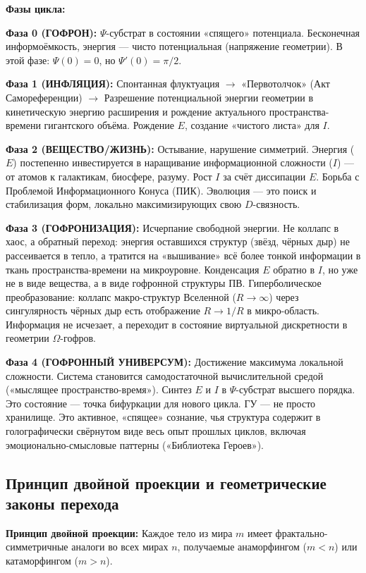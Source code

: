 \documentclass[a4paper,12pt]{article}
\begin{document}
\textbf{Фазы цикла:}

\textbf{Фаза 0 (ГОФРОН):} $\Psi$-субстрат в состоянии «спящего» потенциала. Бесконечная информоёмкость, энергия — чисто потенциальная (напряжение геометрии). В этой фазе: $\Psi(0) = 0$, но $\Psi'(0) = \pi/2$.

\textbf{Фаза 1 (ИНФЛЯЦИЯ):} Спонтанная флуктуация $\to$ «Первотолчок» (Акт Самореференции) $\to$ Разрешение потенциальной энергии геометрии в кинетическую энергию расширения и рождение актуального пространства-времени гигантского объёма. Рождение $E$, создание «чистого листа» для $I$.

\textbf{Фаза 2 (ВЕЩЕСТВО/ЖИЗНЬ):} Остывание, нарушение симметрий. Энергия ($E$) постепенно инвестируется в наращивание информационной сложности ($I$) — от атомов к галактикам, биосфере, разуму. Рост $I$ за счёт диссипации $E$. Борьба с Проблемой Информационного Конуса (ПИК). Эволюция — это поиск и стабилизация форм, локально максимизирующих свою $D$-связность.

\textbf{Фаза 3 (ГОФРОНИЗАЦИЯ):} Исчерпание свободной энергии. Не коллапс в хаос, а обратный переход: энергия оставшихся структур (звёзд, чёрных дыр) не рассеивается в тепло, а тратится на «вышивание» всё более тонкой информации в ткань пространства-времени на микроуровне. Конденсация $E$ обратно в $I$, но уже не в виде вещества, а в виде гофронной структуры ПВ. Гиперболическое преобразование: коллапс макро-структур Вселенной ($R \to \infty$) через сингулярность чёрных дыр есть отображение $R \to 1/R$ в микро-область. Информация не исчезает, а переходит в состояние виртуальной дискретности в геометрии $\Omega$-гофров.

\textbf{Фаза 4 (ГОФРОННЫЙ УНИВЕРСУМ):} Достижение максимума локальной сложности. Система становится самодостаточной вычислительной средой («мыслящее пространство-время»). Синтез $E$ и $I$ в $\Psi$-субстрат высшего порядка. Это состояние — точка бифуркации для нового цикла. ГУ — не просто хранилище. Это активное, «спящее» сознание, чья структура содержит в голографически свёрнутом виде весь опыт прошлых циклов, включая эмоционально-смысловые паттерны («Библиотека Героев»).

\subsection{Принцип двойной проекции и геометрические законы перехода}

\textbf{Принцип двойной проекции:} Каждое тело из мира $m$ имеет фрактально-симметричные аналоги во всех мирах $n$, получаемые анаморфингом ($m < n$) или катаморфингом ($m > n$).
\end{document}

